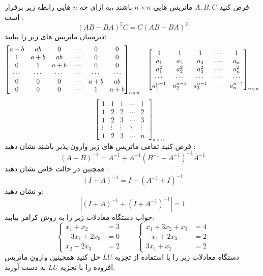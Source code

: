 \documentclass{article}
\begin{document}
فرض کنید 
$A,B,C$
ماتریس هایی 
$n\times n$
 باشند ،به ازای چه 
 $n$
 هایی رابطه زیر برقرار است :
 $$(AB-BA)^2C=C(AB-BA)^2$$
 دترمینان ماتریس های زیر را بیابید:
 $$\begin{bmatrix}
 a+b&ab&0&\cdots&0&0\\
 1&a+b&ab&\cdots&0&0\\
 0&1&a+b&\cdots&0&0\\
 \cdots&\cdots&\cdots&\cdots&\cdots&\cdots\\
 0&0&0&\cdots&a+b&ab\\
 0&0&0&\cdots&1&a+b
 \end{bmatrix}_{n\times n}\quad
 \begin{bmatrix}
 1&1&1&\cdots&1\\
 a_1&a_2&a_3&\cdots&a_n\\
 a_1^2&a_2^2&a_3^2&\cdots&a_n^2\\
 \cdots&\cdots&\cdots&\cdots&\cdots\\
 a_1^{n-1}&a_2^{n-1}&a_3^{n-1}&\cdots&a_n^{n-1}
\end{bmatrix}_{n\times n}\\
 $$
 $$
 \begin{bmatrix}
 1&1&1&\cdots&1\\
 1&2&2&\cdots&2\\
 1&2&3&\cdots&3\\
 \vdots&\vdots&\vdots&\ddots&\vdots\\
 1&2&3&\cdots&n
 \end{bmatrix}_{n\times n}\quad
  $$
 فرض کنید تمامی ماتریس های زیر وارون پذیر باشند نشان دهید :
 $$(A-B)^{-1}=A^{-1}+A^{-1}(B^{-1}-A^{-1})^{-1}A^{-1}$$
 همچنین در حالت خاص نشان دهید :
 $$(I+A)^{-1}=I-(A^{-1}+I)^{-1}$$
 و نشان دهید:
 $$|(I+A)^{-1}+(I+A^{-1})^{-1}|=1$$
جواب دستگاه معادلات زیر را به روش کرامر بیابید:
\begin{equation*}
\left\{
\begin{array}{rl}
x_1+x_2&=3\\
-3x_1+2x_3&=0\\
x_2-2x_3&=2
\end{array} \right.\qquad
\left\{
\begin{array}{rl}
x_1+3x_2+x_3&=4\\
-x_1+2x_3&=2\\
3x_1+x_2&=2
\end{array} \right.
\end{equation*}
دستگاه معادلات  زیر را با استفاده از تجزیه 
$LU$
حل کنید همچینین وارون ماتریس افزوده را با تجزیه 
$LU$
به دست آورید.
\end{document}
